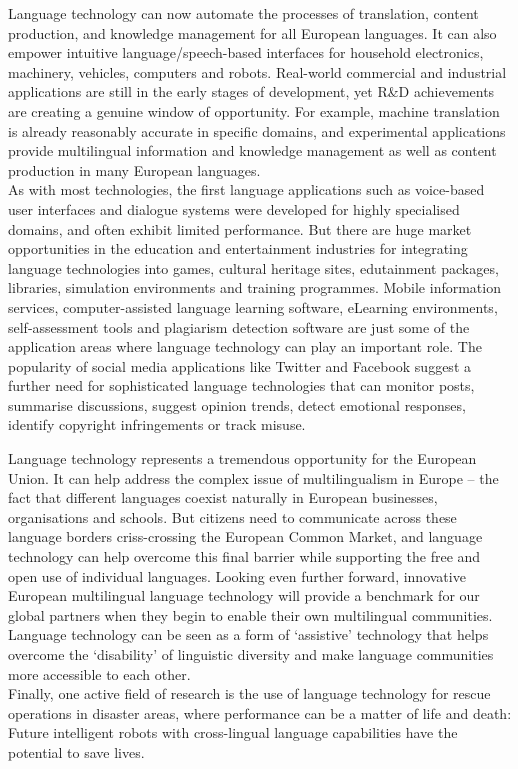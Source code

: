\begin{multicols}{2}
Language technology can now automate the processes of translation,
content production, and knowledge management for all European languages. It can
also empower intuitive language/speech-based interfaces for household
electronics, machinery, vehicles, computers and robots. Real-world commercial
and industrial applications are still in the early stages of development, yet R\&D
achievements are creating a genuine window of opportunity. For example,
machine translation is already reasonably accurate in specific domains, and
experimental applications provide multilingual information and knowledge
management as well as content production in many European languages.\\
As with most technologies, the first language applications such as voice-based
user interfaces and dialogue systems were developed for highly specialised
domains, and often exhibit limited performance. But there are huge market
opportunities in the education and entertainment industries for integrating
language technologies into games, cultural heritage sites, edutainment
packages, libraries, simulation environments and training programmes. Mobile
information services, computer-assisted language learning software, eLearning
environments, self-assessment tools and plagiarism detection software are just
some of the application areas where language technology can play an important
role. The popularity of social media applications like Twitter and Facebook
suggest a further need for sophisticated language technologies that can monitor
posts, summarise discussions, suggest opinion trends, detect emotional
responses, identify copyright infringements or track misuse.


Language technology represents a tremendous opportunity for the European Union.
It can help address the complex issue of multilingualism in Europe – the fact
that different languages coexist naturally in European businesses,
organisations and schools. But citizens need to communicate across these
language borders criss-crossing the European Common Market, and language
technology can help overcome this final barrier while supporting the free and
open use of individual languages. Looking even further forward, innovative
European multilingual language technology will provide a benchmark for our
global partners when they begin to enable their own multilingual communities.
Language technology can be seen as a form of ‘assistive’ technology that helps
overcome the ‘disability’ of linguistic diversity and make language communities
more accessible to each other.\\
Finally, one active field of research is the use of language technology for
rescue operations in disaster areas, where performance can be a matter of life
and death: Future intelligent robots with cross-lingual language capabilities
have the potential to save lives.


\end{multicols}
